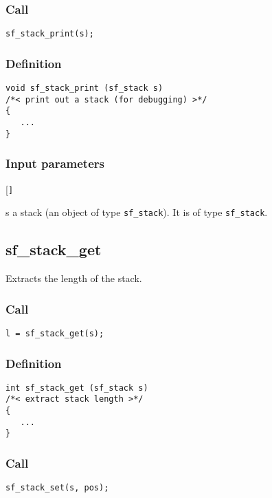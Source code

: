 \subsubsection*{Call}
\begin{verbatim}sf_stack_print(s);\end{verbatim}

\subsubsection*{Definition}
\begin{verbatim}
void sf_stack_print (sf_stack s)
/*< print out a stack (for debugging) >*/ 
{
   ...
}
\end{verbatim}

\subsubsection*{Input parameters}
\begin{desclist}{\tt }{\quad}[\tt ]
   \setlength\itemsep{0pt}
   \item[s] a stack (an object of type \texttt{sf\_stack}). It is of type \texttt{sf\_stack}.
\end{desclist}




\subsection{{sf\_stack\_get}}
Extracts the length of the stack.

\subsubsection*{Call}
\begin{verbatim}l = sf_stack_get(s);\end{verbatim}

\subsubsection*{Definition}
\begin{verbatim}
int sf_stack_get (sf_stack s) 
/*< extract stack length >*/
{
   ... 
}
\end{verbatim}

\subsubsection*{Call}
\begin{verbatim}sf_stack_set(s, pos);\end{verbatim}

